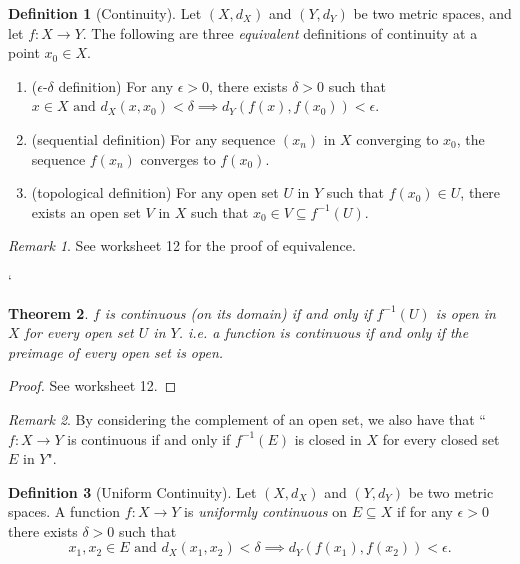\documentclass[12pt, lettersize]{book}
\theoremstyle{plain}
\newtheorem{thm}{Theorem}[section]
\theoremstyle{definition}
\newtheorem{dfn}[thm]{Definition}
\theoremstyle{remark}
\newtheorem*{rem}{Remark}
\begin{document}
			\begin{dfn}[Continuity]\label{def:continuity (Metrics)}
			Let $(X, d_X)$ and $(Y, d_Y)$ be two metric spaces, and let $f: X\rightarrow Y$. The following are three \emph{equivalent} definitions of continuity at a point $x_0\in X$.
			\begin{enumerate}
				\item ($\epsilon$-$\delta$ definition) For any $\epsilon>0$, there exists $\delta>0$ such that $x\in X\text{ and }d_X(x,x_0)<\delta\implies d_Y(f(x),f(x_0))<\epsilon$.
				\item (sequential definition) For any sequence $(x_n)$ in $X$ converging to $x_0$, the sequence $f(x_n)$ converges to $f(x_0)$.
				\item (topological definition) For any open set $U$ in $Y$ such that $f(x_0)\in U$, there exists an open set $V$ in $X$ such that $x_0\in V\subseteq f^{-1}(U)$.
			\end{enumerate}
			\end{dfn}
			\begin{rem}
				See worksheet 12 for the proof of equivalence.
			\end{rem}
		`	
			\begin{thm}\label{thm:preimage is open}
			$f$ is continuous (on its domain) if and only if $f^{-1}(U)$ is open in $X$ for every open set $U$ in $Y$. i.e. a function is continuous if and only if the preimage of every open set is open.
			\end{thm}
			\begin{proof}
				See worksheet 12.
			\end{proof}
			\begin{rem}
			By considering the complement of an open set, we also have that ``$f:X\rightarrow Y$ is continuous if and only if $f^{-1}(E)$ is closed in $X$ for every closed set $E$ in $Y$".
			\end{rem}
			
			\begin{dfn}[Uniform Continuity]
			Let $(X,d_X)$ and $(Y,d_Y)$ be two metric spaces. A function $f: X\rightarrow Y$ is \emph{uniformly continuous} on $E\subseteq X$ if for any $\epsilon>0$ there exists $\delta>0$ such that
			\begin{displaymath}
				x_1,x_2\in E\text{ and }d_X(x_1,x_2)<\delta\implies d_Y(f(x_1),f(x_2))<\epsilon.
			\end{displaymath} 
			\end{dfn}
			
\end{document}
